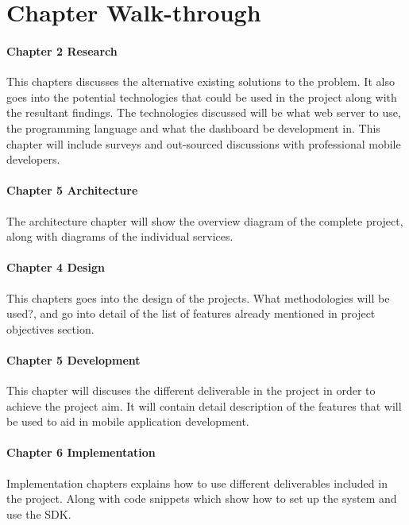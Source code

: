\section{Chapter Walk-through}

\paragraph{Chapter 2 Research}

This chapters discusses the alternative existing solutions to the problem. It also goes into the potential technologies that could be used in the project along with the resultant findings. The technologies discussed will be what web server to use, the programming language and what the dashboard be development in. This chapter will include surveys and out-sourced discussions with professional mobile developers.

\paragraph{Chapter 5 Architecture}

The architecture chapter will show the overview diagram of the complete project, along with diagrams of the individual services.

\paragraph{Chapter 4 Design}

This chapters goes into the design of the projects. What methodologies will be used?, and go into detail of the list of features already mentioned in project objectives section.

\paragraph{Chapter 5 Development}

This chapter will discuses the different deliverable in the project in order to achieve the project aim. It will contain detail description of the features that will be used to aid in mobile application development.

\paragraph{Chapter 6 Implementation}

Implementation chapters explains how to use different deliverables included in the project. Along with code snippets which show how to set up the system and use the SDK.

